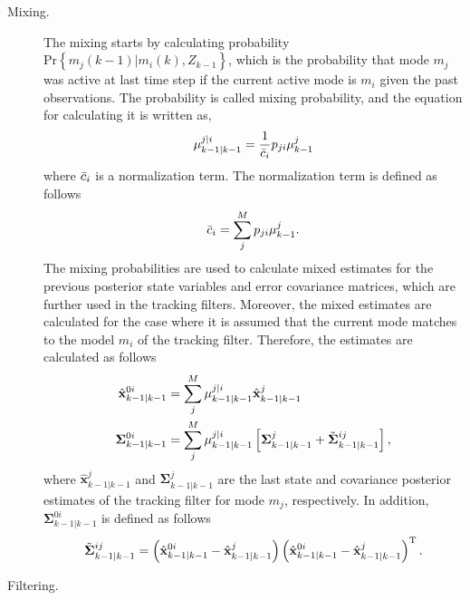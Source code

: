 \documentclass[english, 12pt, a4paper, elec, utf8, a-1b, online]{aaltothesis}
\renewcommand{\Pr}[1]{\text{Pr}\left\{ #1 \right\}}
\renewcommand{\vec}[1]{\mathbf{#1}}
\newcommand{\transpose}[1]{#1^\text{T}}
\newcommand{\lastmxprobs}{\mu^{j|i}_{k-1|k-1}}
\newcommand{\mxnorm}{ \Bar{c}_i }
\newcommand{\xmxinit}{\hat{\vec{x}}^{0i}_{k-1|k-1}}
\newcommand{\ecovmxinit}{\bm{\Sigma}^{0i}_{k-1|k-1}}
\newcommand{\modexlast}{\hat{\vec{x}}^{j}_{k-1|k-1}}
\newcommand{\modecovlast}{\bm{\Sigma}^j_{k-1|k-1}}
\newcommand{\modemxcovlast}{\Tilde{\bm{\Sigma}}^{ij}_{k-1|k-1}}
\begin{document}
\begin{description}
\item[Mixing.]

The mixing starts by calculating probability $\Pr{m_j(k-1)|m_i(k), Z_{k-1}}$, which is the probability that mode $m_j$ was active at last time step if the current active mode is $m_i$ given the past observations.
The probability is called mixing probability, and the equation for calculating it is written as,
\begin{equation}
    \lastmxprobs = \frac{1}{\mxnorm} p_{ji} \mu^j_{k-1} \label{eq:imm_mx_probs}
\end{equation}
where $\mxnorm$ is a normalization term. 
The normalization term is defined as follows
\begin{equation}
    \mxnorm = \sum_j^M p_{ji} \mu^j_{k-1}. \label{eq:imm_mx_normalization}
\end{equation}
The mixing probabilities are used to calculate mixed estimates for the previous posterior state variables and error covariance matrices, which are further used in the tracking filters.
Moreover, the mixed estimates are calculated for the case where it is assumed that the current mode matches to the model $m_i$ of the tracking filter.
Therefore, the estimates are calculated as follows
\begin{subequations}
\begin{align}
    \xmxinit &= \sum_j^M \lastmxprobs \modexlast \label{eq:imm_mx_init_x}\\
    \ecovmxinit &= \sum_j^M \lastmxprobs \left[ \modecovlast + \modemxcovlast \right], \label{eq:imm_mx_init_P}
\end{align}
\end{subequations}
where $\modexlast$ and $\modecovlast$ are the last state and covariance posterior estimates of the tracking filter for mode $m_j$, respectively. 
In addition, $\ecovmxinit$ is defined as follows
\begin{equation}
    \modemxcovlast = 
    \left( \xmxinit - \modexlast  \right) 
    \transpose{\left( \xmxinit - \modexlast   \right)}.\label{eq:imm_mx_init_Ptilde}
\end{equation}

\item[Filtering.]


\end{description}
\end{document}
